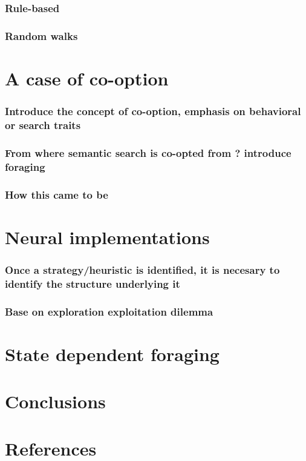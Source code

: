 \documentclass[11pt]{article}
\begin{document}
\subsubsection{Rule-based}
\label{sec:org6e1b815}
\subsubsection{Random walks}
\label{sec:orge2fd6c0}
\newpage
\section{A case of co-option}
\label{sec:orgb0b5b54}
\subsubsection{Introduce the concept of co-option, emphasis on behavioral or search traits}
\label{sec:org0cb1839}
\subsubsection{From where semantic search is co-opted from ? introduce foraging}
\label{sec:orgcf17438}
\subsubsection{How this came to be}
\label{sec:orga8392a9}
\newpage
\section{Neural implementations}
\label{sec:org57a64f5}
\subsubsection{Once a strategy/heuristic is identified, it is necesary to identify the structure underlying it}
\label{sec:org9bad9a7}
\subsubsection{Base on exploration exploitation dilemma}
\label{sec:org0af76b7}
\newpage
\section{State dependent foraging}
\label{sec:org26fa7c9}
\newpage
\section{Conclusions}
\label{sec:orgbe6015a}
\newpage
\section{References}
\label{sec:org77a5bd1}



\end{document}
